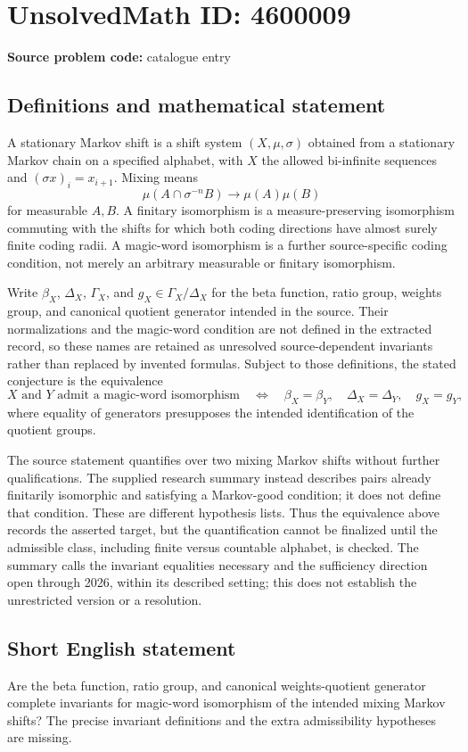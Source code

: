 \documentclass[11pt]{article}
\begin{document}
\section*{UnsolvedMath ID: 4600009}
\textbf{Source problem code:} catalogue entry
\subsection{Definitions and mathematical statement}
A stationary Markov shift is a shift system \((X,\mu,\sigma)\) obtained from a stationary Markov chain on a specified alphabet, with \(X\) the allowed bi-infinite sequences and \((\sigma x)_i=x_{i+1}\). Mixing means
\[
\mu(A\cap\sigma^{-n}B)\longrightarrow\mu(A)\mu(B)
\]
for measurable \(A,B\). A finitary isomorphism is a measure-preserving isomorphism commuting with the shifts for which both coding directions have almost surely finite coding radii. A magic-word isomorphism is a further source-specific coding condition, not merely an arbitrary measurable or finitary isomorphism.

Write \(\beta_X\), \(\Delta_X\), \(\Gamma_X\), and \(g_X\in\Gamma_X/\Delta_X\) for the beta function, ratio group, weights group, and canonical quotient generator intended in the source. Their normalizations and the magic-word condition are not defined in the extracted record, so these names are retained as unresolved source-dependent invariants rather than replaced by invented formulas. Subject to those definitions, the stated conjecture is the equivalence
\[
X\text{ and }Y\text{ admit a magic-word isomorphism}
\quad\Longleftrightarrow\quad
\beta_X=\beta_Y,\quad\Delta_X=\Delta_Y,\quad g_X=g_Y,
\]
where equality of generators presupposes the intended identification of the quotient groups.

The source statement quantifies over two mixing Markov shifts without further qualifications. The supplied research summary instead describes pairs already finitarily isomorphic and satisfying a Markov-good condition; it does not define that condition. These are different hypothesis lists. Thus the equivalence above records the asserted target, but the quantification cannot be finalized until the admissible class, including finite versus countable alphabet, is checked. The summary calls the invariant equalities necessary and the sufficiency direction open through 2026, within its described setting; this does not establish the unrestricted version or a resolution.
\subsection{Short English statement}
Are the beta function, ratio group, and canonical weights-quotient generator complete invariants for magic-word isomorphism of the intended mixing Markov shifts? The precise invariant definitions and the extra admissibility hypotheses are missing.
\end{document}
